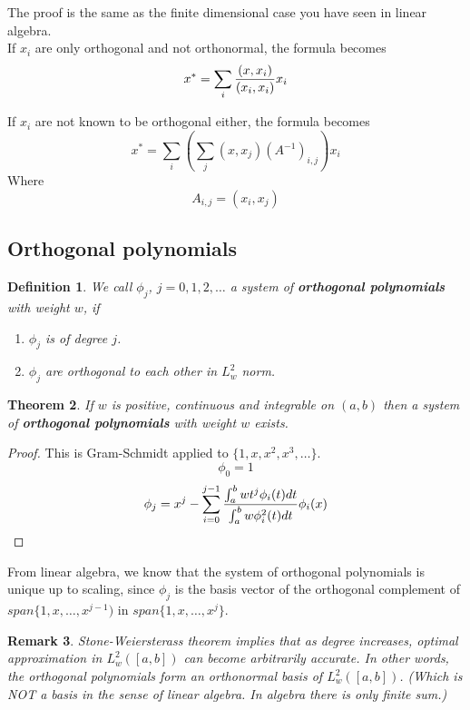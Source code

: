 \documentclass{article} %
\theoremstyle{break}
\newtheorem{definition}{Definition}[section]
\newtheorem{thm}[definition]{Theorem}
\newtheorem{rem}[definition]{Remark}
\begin{document}
The proof is the same as the finite dimensional case you have seen in linear algebra.\\

If $x_i$ are only orthogonal and not orthonormal, the formula becomes
\[x^*=\sum_i{(x, x_i)\over (x_i, x_i)}x_i\]

If $x_i$ are not known to be orthogonal either, the formula becomes
\[x^*=\sum_i(\sum_j(x, x_j)(A^{-1})_{i, j})x_i\]
Where
\[A_{i,j}=(x_i, x_j)\]


\subsection{Orthogonal polynomials}

\begin{definition}We call $\phi_j$, $j=0, 1, 2, \dots$ a system of {\bf orthogonal polynomials} with weight $w$, if 
  \begin{enumerate}
   \item $\phi_j$ is of degree $j$.
   \item $\phi_j$ are orthogonal to each other in $L^2_w$ norm.
  \end{enumerate}
\end{definition}

\begin{thm}\label{orth_exist} If $w$ is positive, continuous and integrable on $(a, b)$ then a system of {\bf orthogonal polynomials} with weight $w$ exists. \end{thm}

\begin{proof}
  This is Gram-Schmidt applied to $\{1, x, x^2, x^3, \dots\}$.
  \[\phi_0=1\]
  \[\phi_j=x^j-\sum_{i=0}^{j-1}{\int_a^b wt^j\phi_i(t)dt\over \int_a^b w\phi_i^2(t)dt}\phi_i(x)\] 
\end{proof}


From linear algebra, we know that the system of orthogonal polynomials is unique up to scaling, since $\phi_j$ is the basis vector of the orthogonal complement of $span\{1, x, \dots, x^{j-1})$ in $span\{1, x, \dots, x^j\}$.\\


 \begin{rem}Stone-Weiersterass theorem implies that as degree increases, optimal approximation in $L^2_w([a, b])$ can become arbitrarily accurate. In other words, the orthogonal polynomials form an orthonormal basis of $L^2_w([a, b])$. (Which is NOT a basis in the sense of linear algebra. In algebra there is only finite sum.)
 \end{rem}
\end{document}

